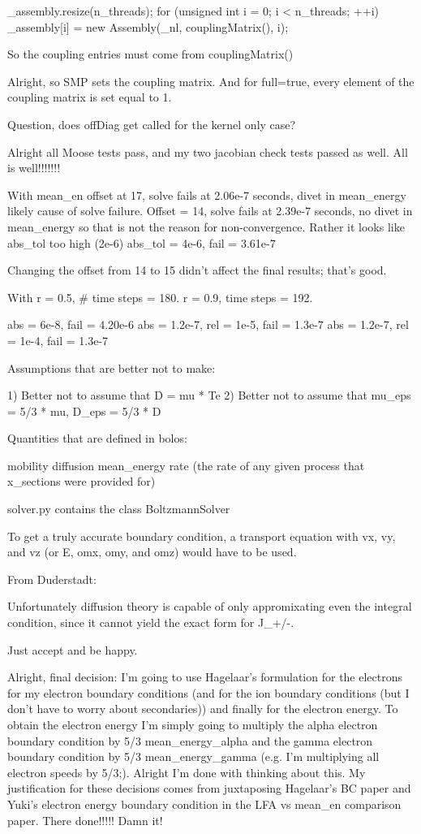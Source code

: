 {  _assembly.resize(n_threads);
  for (unsigned int i = 0; i < n_threads; ++i)
    _assembly[i] = new Assembly(_nl, couplingMatrix(), i);

So the coupling entries must come from couplingMatrix()

Alright, so SMP sets the coupling matrix. And for full=true, every element of the coupling matrix is set equal to 1.

Question, does offDiag get called for the kernel only case?

Alright all Moose tests pass, and my two jacobian check tests passed as well. All is well!!!!!!!

With mean_en offset at 17, solve fails at 2.06e-7 seconds, divet in mean_energy likely cause of solve failure.
Offset = 14, solve fails at 2.39e-7 seconds, no divet in mean_energy so that is not the reason for non-convergence. Rather it looks like abs_tol too high (2e-6)
abs_tol = 4e-6, fail = 3.61e-7

Changing the offset from 14 to 15 didn't affect the final results; that's good.

With r = 0.5, # time steps = 180.
r = 0.9, time steps = 192.

abs = 6e-8, fail = 4.20e-6
abs = 1.2e-7, rel = 1e-5, fail = 1.3e-7
abs = 1.2e-7, rel = 1e-4, fail = 1.3e-7

Assumptions that are better not to make:

1) Better not to assume that D = mu * Te
2) Better not to assume that mu_eps = 5/3 * mu, D_eps = 5/3 * D

Quantities that are defined in bolos:

mobility
diffusion
mean_energy
rate (the rate of any given process that x_sections were provided for)

solver.py contains the class BoltzmannSolver

To get a truly accurate boundary condition, a transport equation with vx, vy, and vz (or E, omx, omy, and omz) would have to be used.

From Duderstadt:

Unfortunately diffusion theory is capable of only appromixating even the integral condition, since it cannot yield the exact form for J_{+/-}.

Just accept and be happy.

Alright, final decision: I'm going to use Hagelaar's formulation for the electrons for my electron boundary conditions (and for the ion boundary conditions (but I don't have to worry about secondaries)) and finally for the electron energy. To obtain the electron energy I'm simply going to multiply the alpha electron boundary condition by 5/3 mean_energy_alpha and the gamma electron boundary condition by 5/3 mean_energy_gamma (e.g. I'm multiplying all electron speeds by 5/3;). Alright I'm done with thinking about this. My justification for these decisions comes from juxtaposing Hagelaar's BC paper and Yuki's electron energy boundary condition in the LFA vs mean_en comparison paper. There done!!!!! Damn it!


}
